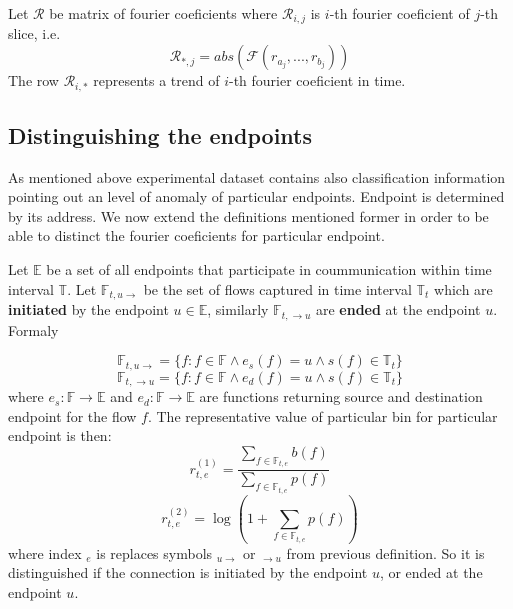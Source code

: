 \documentclass[a4paper,journal]{IEEEtran}
\begin{document}
Let $\mathcal{R}$ be matrix of fourier coeficients where
$\mathcal{R}_{i,j}$ is $i$-th fourier coeficient of $j$-th slice,
i.e. 
\begin{equation}
\mathcal{R}_{*,j} = abs(\mathcal{F}(r_{a_j}, ..., r_{b_j}))
\end{equation}
The row $\mathcal{R}_{i,*}$ represents a trend of $i$-th fourier
coeficient in time.

\subsection{Distinguishing the endpoints}
As mentioned above experimental dataset contains also
classification information pointing out an level of anomaly of 
particular endpoints. Endpoint is determined by its address.
We now extend the definitions mentioned
former in order to be able to distinct the fourier coeficients for
particular endpoint.

Let $\mathbb{E}$ be a set of all endpoints that
participate in coummunication within time interval $\mathbb{T}$.
Let $\mathbb{F}_{t,u \rightarrow}$ be the set of flows captured in
time interval $\mathbb{T}_{t}$ %
which are \textbf{initiated} by the endpoint $u \in \mathbb{E}$,
similarly $\mathbb{F}_{t, \rightarrow u}$ are \textbf{ended} at the
endpoint $u$. Formaly

\begin{equation}
\mathbb{F}_{t,u \rightarrow} = \{f : f \in \mathbb{F} \wedge e_{s}(f) = u \wedge s(f) \in \mathbb{T}_t \}
\end{equation}
\begin{equation}
\mathbb{F}_{t, \rightarrow u} = \{f : f \in \mathbb{F} \wedge e_{d}(f) = u \wedge s(f) \in \mathbb{T}_t \}
\end{equation}
where $e_{s}:\mathbb{F}\rightarrow \mathbb{E}$ and
$e_{d}:\mathbb{F}\rightarrow \mathbb{E}$ 
are functions returning source and destination endpoint for the 
flow $f$.
The representative value of particular bin for particular endpoint is 
then:
\begin{equation}\label{bigrepr1}
r_{t,e}^{(1)} = \frac{\sum\limits_{f\in \mathbb{F}_{t,e}}b(f)}{\sum\limits_{f\in \mathbb{F}_{t,e}}p(f)}
\end{equation}
\begin{equation}\label{bigrepr2}
r_{t,e}^{(2)} = \log(1+\sum\limits_{f\in \mathbb{F}_{t,e}}p(f))
\end{equation}
where index ${}_e$ is replaces symbols ${}_{u\rightarrow}$ or 
${}_{\rightarrow u}$ from previous definition. So it is distinguished 
if the connection is initiated by the endpoint $u$, or ended at the
endpoint $u$.
\end{document}
